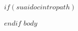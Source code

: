 \documentclass[a4paper]{article}
\begin{document}
$if(suaidocintropath)$

$endif$
\sloppy
\tableofcontents
$body$
\end{document}

